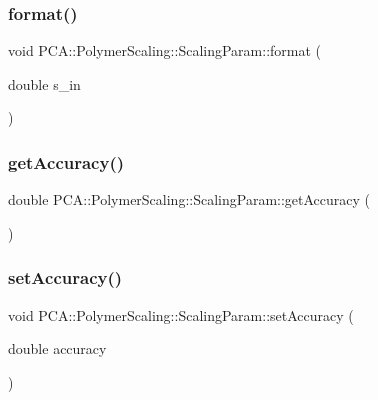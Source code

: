 \subsubsection{\texorpdfstring{format()}{format()}}
{\footnotesize\ttfamily void P\+C\+A\+::\+Polymer\+Scaling\+::\+Scaling\+Param\+::format (\begin{DoxyParamCaption}\item[{double}]{s\+\_\+in }\end{DoxyParamCaption})}

\hypertarget{class_p_c_a_1_1_polymer_scaling_1_1_scaling_param_a6967872a0025d89438b4bb68b1c680bc}{}\label{class_p_c_a_1_1_polymer_scaling_1_1_scaling_param_a6967872a0025d89438b4bb68b1c680bc} 
\subsubsection{\texorpdfstring{get\+Accuracy()}{getAccuracy()}}
{\footnotesize\ttfamily double P\+C\+A\+::\+Polymer\+Scaling\+::\+Scaling\+Param\+::get\+Accuracy (\begin{DoxyParamCaption}{ }\end{DoxyParamCaption})\hspace{0.3cm}{\ttfamily [static]}}

\hypertarget{class_p_c_a_1_1_polymer_scaling_1_1_scaling_param_adba9217facd6feba2b8477743416f32a}{}\label{class_p_c_a_1_1_polymer_scaling_1_1_scaling_param_adba9217facd6feba2b8477743416f32a} 
\subsubsection{\texorpdfstring{set\+Accuracy()}{setAccuracy()}}
{\footnotesize\ttfamily void P\+C\+A\+::\+Polymer\+Scaling\+::\+Scaling\+Param\+::set\+Accuracy (\begin{DoxyParamCaption}\item[{double}]{accuracy }\end{DoxyParamCaption})\hspace{0.3cm}{\ttfamily [static]}}



